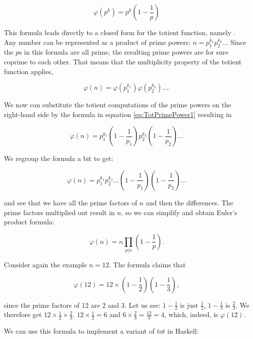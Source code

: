 \documentclass[tikz]{scrreprt}
\newcommand{\Varid}[1]{\mathit{#1}}
\begin{document}
\begin{equation}\label{eq:TotPrimePower1}
\varphi\left(p^k\right) = p^k \left(1-\frac{1}{p}\right)
\end{equation}

This formula leads directly to a closed form
for the totient function, namely .
Any number can be represented as a product of prime powers:
$n = p_1^{k_1}p_2^{k_2}\dots$
Since the $p$s in this formula are all prime,
the resulting prime powers are for sure coprime to each other.
That means that the multiplicity property of 
the totient function applies, \ie\ 

\[
\varphi(n) = \varphi\left(p_1^{k_1}\right)\varphi\left(p_2^{k_2}\right)\dots.
\]

We now can substitute the totient computations 
of the prime powers on the right-hand side
by the formula in equation \ref{eq:TotPrimePower1}
resulting in 

\[
\varphi(n) = p_1^{k_1}\left(1-\frac{1}{p_1}\right)
             p_2^{k_2}\left(1-\frac{1}{p_2}\right)
             \dots
\]

We regroup the formula a bit to get:

\[
\varphi(n) = p_1^{k_1}p_2^{k_2}\dots
             \left(1-\frac{1}{p_1}\right)
             \left(1-\frac{1}{p_2}\right)
             \dots
\]

and see that we have all the prime factors of $n$
and then the differences. The prime factors
multiplied out result in $n$, so we can simplify
and obtain Euler's product formula:

\begin{equation}\label{eq:prodForm1}
\varphi(n) = n \prod_{p|n}{\left(1-\frac{1}{p}\right)}.
\end{equation}

Consider again the example $n=12$.
The formula claims that 

\[
\varphi(12) = 12 \times \left(1-\frac{1}{2}\right)
                        \left(1-\frac{1}{3}\right),
\]

since the prime factors of 12 are 2 and 3.
Let us see: $1-\frac{1}{2}$ is just $\frac{1}{2}$,
$1-\frac{1}{3}$ is $\frac{2}{3}$.
We therefore get 
$12 \times \frac{1}{2} \times \frac{2}{3}$.
$12 \times \frac{1}{2} = 6$ and
$6 \times \frac{2}{3} = \frac{12}{3} = 4$,
which, indeed, is $\varphi(12)$.

We can use this formula to implement
a variant of \ensuremath{\Varid{tot}} in Haskell:
\end{document}
